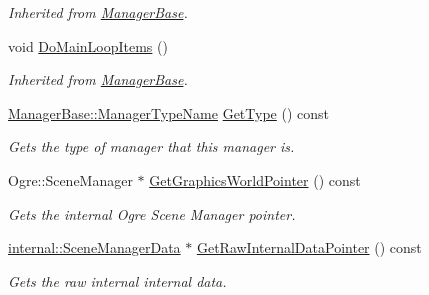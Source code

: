 \begin{DoxyCompactItemize}
\begin{DoxyCompactList}\small\item\em Inherited from \hyperlink{classphys_1_1ManagerBase}{ManagerBase}. \item\end{DoxyCompactList}\item 
\hypertarget{classphys_1_1SceneManager_a27a3f6b21e15f628642b1cad524f1a18}{
void \hyperlink{classphys_1_1SceneManager_a27a3f6b21e15f628642b1cad524f1a18}{DoMainLoopItems} ()}
\label{dd/da8/classphys_1_1SceneManager_a27a3f6b21e15f628642b1cad524f1a18}

\begin{DoxyCompactList}\small\item\em Inherited from \hyperlink{classphys_1_1ManagerBase}{ManagerBase}. \item\end{DoxyCompactList}\item 
\hyperlink{classphys_1_1ManagerBase_aaa6ccddf23892eaccb898529414f80a5}{ManagerBase::ManagerTypeName} \hyperlink{classphys_1_1SceneManager_af2b4f6bc50d40ffe06f6172c3d1dd02d}{GetType} () const 
\begin{DoxyCompactList}\small\item\em Gets the type of manager that this manager is. \item\end{DoxyCompactList}\item 
Ogre::SceneManager $\ast$ \hyperlink{classphys_1_1SceneManager_aa6bfec6329ecfb7c6196f488e1499c3c}{GetGraphicsWorldPointer} () const 
\begin{DoxyCompactList}\small\item\em Gets the internal Ogre Scene Manager pointer. \item\end{DoxyCompactList}\item 
\hyperlink{classphys_1_1internal_1_1SceneManagerData}{internal::SceneManagerData} $\ast$ \hyperlink{classphys_1_1SceneManager_a8f9073372374320723b7381f326f8753}{GetRawInternalDataPointer} () const 
\begin{DoxyCompactList}\small\item\em Gets the raw internal internal data. \item\end{DoxyCompactList}\end{DoxyCompactItemize}
